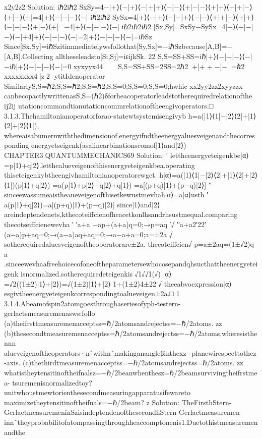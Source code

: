 {{x2y2z2
Solution:
iℏ2iℏ2
SxSy=4{−|+⟩⟨−|+⟩⟨−|+|+⟩⟨−|−⟩⟨+|−|−⟩⟨+|+⟩⟨−|+|−⟩⟨+|−⟩⟨+|}=4{|+⟩⟨−|−|−⟩⟨−|}
iℏ2iℏ2
SySx=4{|+⟩⟨−|+⟩⟨−|−|+⟩⟨−|−⟩⟨+|+|−⟩⟨+|+⟩⟨−|−|−⟩⟨+|−⟩⟨+|}=−4{|+⟩⟨−|−|−⟩⟨−|}
iℏ2iℏ2iℏ2
[Sx,Sy]=SxSy−SySx=4{|+⟩⟨−|−|−⟩⟨−|}+4{|+⟩⟨−|−|−⟩⟨−|}=2{|+⟩⟨−|−|−⟩⟨−|}=iℏSz
Since[Sx,Sy]=iℏSzitimmediatelywsfollothat[Sy,Sx]=−iℏSzbecause[A,B]=−[A,B].Collecting
alltheseleadsto[Si,Sj]=iεijkSk.
22
{S,S}=SS+SS=iℏ{|+⟩⟨−|−|−⟩⟨−|}−iℏ{|+⟩⟨−|−|−⟩⟨−|}=0
xyxyyx44


{S,S}=SS+SS=2SS=2ℏ2⟨+|+⟩+⟨−|−⟩=ℏ2
xxxxxxxx4|{z}2
ytitIdenoperator
Similarly{S,S}=ℏ2;{S,S}=ℏ2;{S,S}=ℏ2;{S,S}=0;{S,S}=0;{S,S}=0;hwhic
xx2yy2zz2xyyzzx
canbecopactlywrittenas{S,S}=(ℏ2)δforheacoperatorleadstotherequiredrelationofthe
ij2ij
utationcommandtianutationcommrelationoftheengivoperators.□
3.1.3.Thehamiltonianoperatorforao-statewtsystemisengivyb
h=a(|1⟩⟨1|−|2⟩⟨2|+|1⟩⟨2|+|2⟩⟨1|),
whereaisabumernwiththedimensionof.energyifndtheenergyaluesveigenandthecorresponding
energyetseigenk(asalinearbinationscomof|1⟩and|2⟩)
CHAPTER3.QUANTUMMECHANICS69
Solution:
′
lettheenergyeteigenkbe|α⟩=p|1⟩+q|2⟩.letthealueveigenofthisenergyeteigenkbea.operating
thiseteigenkybtheengivhamiltonianoperatorewget.
h|α⟩=a(|1⟩⟨1|−|2⟩⟨2|+|1⟩⟨2|+|2⟩⟨1|)(p|1⟩+q|2⟩)
=a(p|1⟩+p|2⟩−q|2⟩+q|1⟩)
=a[(p+q)|1⟩+(p−q)|2⟩]
′′
sinceewassumeaistheaueveigenofthisetkewustmevhah|α⟩=a|α⟩usth
′
a(p|1⟩+q|2⟩)=a[(p+q)|1⟩+(p−q)|2⟩]
since|1⟩and|2⟩areindeptendenets,kthecoteiffcienofheacetkonlhsandrhsustmequal.comparing
thecotseiffcienewevha
′
′a+a
−ap+(a+a)q=0;→p=aq
′√
′′a+a2′22′
(a−a)p+aq=0;→(a−a)aq+aq=0;→a−a+a=0;a=±2a
√
sotherequiredaluesveigenoftheoperatorare±2a.
thecoteiffcien√
p=a±2aq=(1±√2)q
a
.sinceewevhaafreehoicecofoneoftheparametersewhocosepandqhsucthattheenergyeteigenk
isnormalized.sotherequiredeteigenkis
√1√√1(√)
|α⟩=√2((1±2)|1⟩+|2⟩)=√(1±2)|1⟩+|2⟩
1+(1±2)4±22
√
theeabvoexpression|α⟩esgivtheenergyeteigenkcorrespondingtoalueveigen±2a.□
1
3.1.4.Abeamofspin2atomgoesthroughaseriesofyph-testern-gerlactsmeasuremenasws:follo
(a)theifrsttmeasuremenacceptss=ℏ/2atomsandrejectss=−ℏ/2atoms.
zz
(b)thesecondtmeasuremenacceptss=ℏ/2atomsandrejectss=−ℏ/2atoms,wheresisthe
nnn
alueveigenoftheoperators·nˆwithnˆmakinganangleβinthexz−planewirespecttothez-axis.
(c)thethirdtmeasuremenacceptss=−ℏ/2atomsandrejectss=ℏ/2atoms.
zz
whatistheytensitinoftheifnalsz=−ℏ/2beanwhenthesz=ℏ/2beamsurvivingtheifrstmea-
tsuremenisnormalizedtoy?unitwhoustmewtorienthesecondmeasuringapparatusifewareto
maximizetheytensitinoftheifnals=−ℏ/2beam?
z
Solution:
TheFirsthStern-GerlactmeasuremeninSzisindeptendenofthesecondhStern-Gerlactmeasuremen
innˆtheyprobabilitofatompassingthroughheaccomptonenis1.Duetothistmeasuremenandthe
}}
